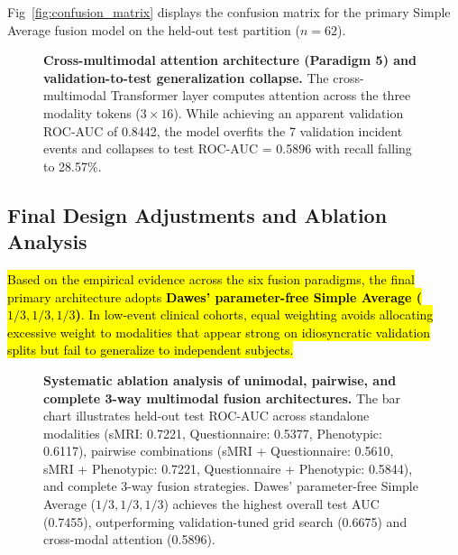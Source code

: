 \documentclass[10pt,letterpaper]{article}
\begin{document}
Fig~\ref{fig:confusion_matrix} displays the confusion matrix for the primary Simple Average fusion model on the held-out test partition ($n=62$).
        \begin{figure}[!h]
        \caption{\textbf{Cross-multimodal attention architecture (Paradigm 5) and validation-to-test generalization collapse.}
        The cross-multimodal Transformer layer computes attention across the three modality tokens ($3 \times 16$). While achieving an apparent validation ROC-AUC of 0.8442, the model overfits the 7 validation incident events and collapses to test ROC-AUC = 0.5896 with recall falling to 28.57\%.}
        \label{fig:cross_modal_attention}
        \end{figure}


\subsection*{Final Design Adjustments and Ablation Analysis}

\hl{Based on the empirical evidence across the six fusion paradigms, the final primary architecture adopts \textbf{Dawes' parameter-free Simple Average ($1/3, 1/3, 1/3$)}. In low-event clinical cohorts, equal weighting avoids allocating excessive weight to modalities that appear strong on idiosyncratic validation splits but fail to generalize to independent subjects.}

\begin{figure}[!h]
\caption{\textbf{Systematic ablation analysis of unimodal, pairwise, and complete 3-way multimodal fusion architectures.}
The bar chart illustrates held-out test ROC-AUC across standalone modalities (sMRI: 0.7221, Questionnaire: 0.5377, Phenotypic: 0.6117), pairwise combinations (sMRI + Questionnaire: 0.5610, sMRI + Phenotypic: 0.7221, Questionnaire + Phenotypic: 0.5844), and complete 3-way fusion strategies. Dawes' parameter-free Simple Average ($1/3, 1/3, 1/3$) achieves the highest overall test AUC (0.7455), outperforming validation-tuned grid search (0.6675) and cross-modal attention (0.5896).}
\label{fig:ablation_analysis}
\end{figure}
\end{document}
